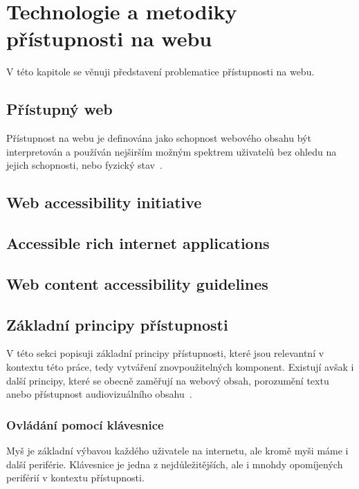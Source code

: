 \chapter{Technologie a metodiky přístupnosti na webu}

V této kapitole se věnuji představení problematice přístupnosti na webu.

\section{Přístupný web}

Přístupnost na webu je definována jako schopnost webového obsahu být interpretován a používán nejširším možným spektrem uživatelů bez ohledu na jejich schopnosti, nebo fyzický stav~\cite{w3-accessibility}.

\section{Web accessibility initiative}

\section{Accessible rich internet applications}

\section{Web content accessibility guidelines}

\section{Základní principy přístupnosti}

V této sekci popisuji základní principy přístupnosti, které jsou relevantní v kontextu této práce, tedy vytváření znovpoužitelných komponent.
Existují avšak i další principy, které se obecně zaměřují na webový obsah, porozumění textu anebo přístupnost audiovizuálního obsahu~\cite{w3-accessibility-principles}.

\subsection{Ovládání pomocí klávesnice}

Myš je základní výbavou každého uživatele na internetu, ale kromě myši máme i další periférie.
Klávesnice je jedna z nejdůležitějších, ale i mnohdy opomíjených periférií v kontextu přístupnosti.

